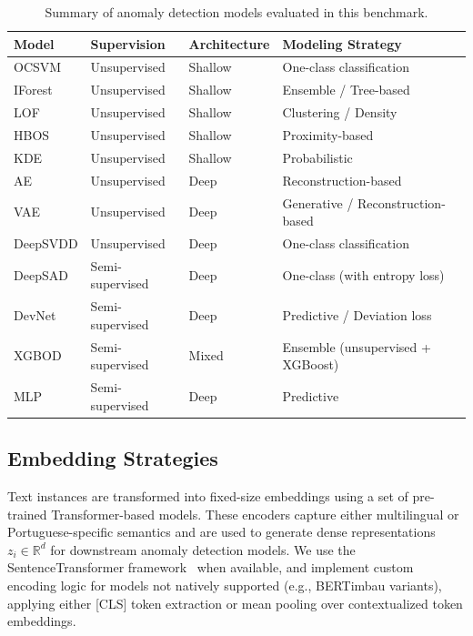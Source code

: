 \documentclass[12pt]{article}
\begin{document}
\renewcommand{\arraystretch}{0.9}
\begin{table}[ht]
\small
\centering
\caption{Summary of anomaly detection models evaluated in this benchmark.}
\label{tab:model-summary}
\begin{tabular}{llll}
\toprule
\textbf{Model} & \textbf{Supervision} & \textbf{Architecture} & \textbf{Modeling Strategy} \\
\midrule
OCSVM          & Unsupervised         & Shallow & One-class classification \\
IForest        & Unsupervised         & Shallow & Ensemble / Tree-based \\
LOF            & Unsupervised         & Shallow & Clustering / Density \\
HBOS           & Unsupervised         & Shallow & Proximity-based \\
KDE            & Unsupervised         & Shallow & Probabilistic \\
AE             & Unsupervised         & Deep    & Reconstruction-based \\
VAE            & Unsupervised         & Deep    & Generative / Reconstruction-based \\
DeepSVDD       & Unsupervised         & Deep    & One-class classification \\
DeepSAD        & Semi-supervised      & Deep    & One-class (with entropy loss) \\
DevNet         & Semi-supervised      & Deep    & Predictive / Deviation loss \\
XGBOD          & Semi-supervised      & Mixed   & Ensemble (unsupervised + XGBoost) \\
MLP            & Semi-supervised      & Deep    & Predictive \\
\bottomrule
\end{tabular}
\end{table}


\subsection{Embedding Strategies}

Text instances are transformed into fixed-size embeddings using a set of pre-trained Transformer-based models. These encoders capture either multilingual or Portuguese-specific semantics and are used to generate dense representations $z_i \in \mathbb{R}^d$ for downstream anomaly detection models. We use the SentenceTransformer framework~\cite{reimers2019sentence} when available, and implement custom encoding logic for models not natively supported (e.g., BERTimbau variants), applying either [CLS] token extraction or mean pooling over contextualized token embeddings.
\end{document}
